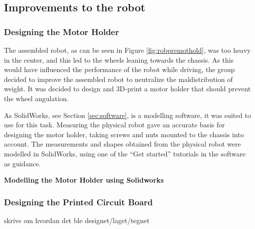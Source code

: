 \subsection{Improvements to the robot}
\label{sec:improvements}

\subsubsection{Designing the Motor Holder}
The assembled robot, as can be seen in Figure \ref{fig:robpremothold}, was too heavy in the center, and this led to the wheels leaning towards the chassis. As this would have influenced the performance of the robot while driving, the group decided to improve the assembled robot to neutralize the maldistribution of weight. It was decided to design and 3D-print a motor holder that should prevent the wheel angulation.

As SolidWorks, see Section \ref{sec:software}, is a modelling software, it was suited to use for this task. Measuring the physical robot gave an accurate basis for designing the motor holder, taking screws and nuts mounted to the chassis into account. The measurements and shapes obtained from the physical robot were modelled in SolidWorks, using one of the ``Get started'' tutorials in the software as guidance.

\textbf{Modelling the Motor Holder using Solidworks}



\subsubsection{Designing the Printed Circuit Board}
skrive om hvordan det ble designet/laget/tegnet